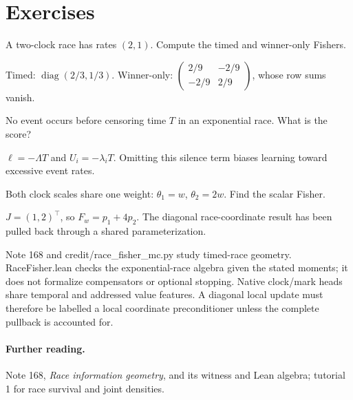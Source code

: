 \documentclass[11pt]{article}
\begin{document}
\section*{Exercises}
\begin{exercise}A two-clock race has rates $(2,1)$. Compute the timed and winner-only Fishers.\end{exercise}
\begin{solution}Timed: $\operatorname{diag}(2/3,1/3)$. Winner-only: $\left(\begin{smallmatrix}2/9&-2/9\\-2/9&2/9\end{smallmatrix}\right)$, whose row sums vanish.\end{solution}
\begin{exercise}No event occurs before censoring time $T$ in an exponential race. What is the score?\end{exercise}
\begin{solution}$\ell=-\Lambda T$ and $U_i=-\lambda_iT$. Omitting this silence term biases learning toward excessive event rates.\end{solution}
\begin{exercise}Both clock scales share one weight: $\theta_1=w$, $\theta_2=2w$. Find the scalar Fisher.\end{exercise}
\begin{solution}$J=(1,2)^\top$, so $F_w=p_1+4p_2$. The diagonal race-coordinate result has been pulled back through a shared parameterization.\end{solution}
\begin{inourmodels}
Note 168 and credit/race\_fisher\_mc.py study timed-race geometry. RaceFisher.lean checks the exponential-race algebra given the stated moments; it does not formalize compensators or optional stopping. Native clock/mark heads share temporal and addressed value features. A diagonal local update must therefore be labelled a local coordinate preconditioner unless the complete pullback is accounted for.
\end{inourmodels}
\paragraph{Further reading.} Note 168, \emph{Race information geometry}, and its witness and Lean algebra; tutorial 1 for race survival and joint densities.
\end{document}
